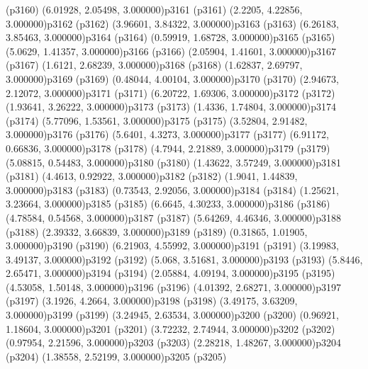 \psdot(p3160)
\psPoint(6.01928, 2.05498, 3.000000){p3161}
\psdot(p3161)
\psPoint(2.2205, 4.22856, 3.000000){p3162}
\psdot(p3162)
\psPoint(3.96601, 3.84322, 3.000000){p3163}
\psdot(p3163)
\psPoint(6.26183, 3.85463, 3.000000){p3164}
\psdot(p3164)
\psPoint(0.59919, 1.68728, 3.000000){p3165}
\psdot(p3165)
\psPoint(5.0629, 1.41357, 3.000000){p3166}
\psdot(p3166)
\psPoint(2.05904, 1.41601, 3.000000){p3167}
\psdot(p3167)
\psPoint(1.6121, 2.68239, 3.000000){p3168}
\psdot(p3168)
\psPoint(1.62837, 2.69797, 3.000000){p3169}
\psdot(p3169)
\psPoint(0.48044, 4.00104, 3.000000){p3170}
\psdot(p3170)
\psPoint(2.94673, 2.12072, 3.000000){p3171}
\psdot(p3171)
\psPoint(6.20722, 1.69306, 3.000000){p3172}
\psdot(p3172)
\psPoint(1.93641, 3.26222, 3.000000){p3173}
\psdot(p3173)
\psPoint(1.4336, 1.74804, 3.000000){p3174}
\psdot(p3174)
\psPoint(5.77096, 1.53561, 3.000000){p3175}
\psdot(p3175)
\psPoint(3.52804, 2.91482, 3.000000){p3176}
\psdot(p3176)
\psPoint(5.6401, 4.3273, 3.000000){p3177}
\psdot(p3177)
\psPoint(6.91172, 0.66836, 3.000000){p3178}
\psdot(p3178)
\psPoint(4.7944, 2.21889, 3.000000){p3179}
\psdot(p3179)
\psPoint(5.08815, 0.54483, 3.000000){p3180}
\psdot(p3180)
\psPoint(1.43622, 3.57249, 3.000000){p3181}
\psdot(p3181)
\psPoint(4.4613, 0.92922, 3.000000){p3182}
\psdot(p3182)
\psPoint(1.9041, 1.44839, 3.000000){p3183}
\psdot(p3183)
\psPoint(0.73543, 2.92056, 3.000000){p3184}
\psdot(p3184)
\psPoint(1.25621, 3.23664, 3.000000){p3185}
\psdot(p3185)
\psPoint(6.6645, 4.30233, 3.000000){p3186}
\psdot(p3186)
\psPoint(4.78584, 0.54568, 3.000000){p3187}
\psdot(p3187)
\psPoint(5.64269, 4.46346, 3.000000){p3188}
\psdot(p3188)
\psPoint(2.39332, 3.66839, 3.000000){p3189}
\psdot(p3189)
\psPoint(0.31865, 1.01905, 3.000000){p3190}
\psdot(p3190)
\psPoint(6.21903, 4.55992, 3.000000){p3191}
\psdot(p3191)
\psPoint(3.19983, 3.49137, 3.000000){p3192}
\psdot(p3192)
\psPoint(5.068, 3.51681, 3.000000){p3193}
\psdot(p3193)
\psPoint(5.8446, 2.65471, 3.000000){p3194}
\psdot(p3194)
\psPoint(2.05884, 4.09194, 3.000000){p3195}
\psdot(p3195)
\psPoint(4.53058, 1.50148, 3.000000){p3196}
\psdot(p3196)
\psPoint(4.01392, 2.68271, 3.000000){p3197}
\psdot(p3197)
\psPoint(3.1926, 4.2664, 3.000000){p3198}
\psdot(p3198)
\psPoint(3.49175, 3.63209, 3.000000){p3199}
\psdot(p3199)
\psPoint(3.24945, 2.63534, 3.000000){p3200}
\psdot(p3200)
\psPoint(0.96921, 1.18604, 3.000000){p3201}
\psdot(p3201)
\psPoint(3.72232, 2.74944, 3.000000){p3202}
\psdot(p3202)
\psPoint(0.97954, 2.21596, 3.000000){p3203}
\psdot(p3203)
\psPoint(2.28218, 1.48267, 3.000000){p3204}
\psdot(p3204)
\psPoint(1.38558, 2.52199, 3.000000){p3205}
\psdot(p3205)
